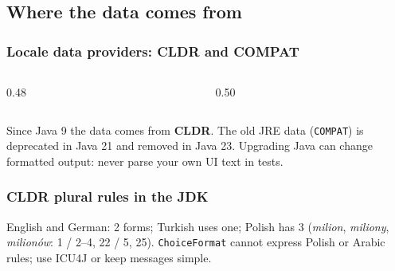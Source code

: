 \documentclass[aspectratio=169,10pt,compress]{beamer}
\begin{document}
\subsection[Providers]{Where the data comes from}




\begin{frame}[t,fragile] \frametitle{Locale data providers: CLDR and COMPAT}
  \begin{columns}[T]
    \begin{column}{0.48\textwidth}
    \end{column}
    \begin{column}{0.50\textwidth}
    \end{column}
  \end{columns}

  \vspace{0.1em}
  \small Since Java 9 the data comes from \textbf{CLDR}. The old JRE data (\texttt{COMPAT}) is deprecated
  in Java 21 and removed in Java 23. Upgrading Java can change formatted output: never parse your own UI text in tests.
\end{frame}





\begin{frame}[t,fragile] \frametitle{CLDR plural rules in the JDK}

  \vspace{0.1em}
  \small
  English and German: 2 forms; Turkish uses one; Polish has 3 (\emph{milion}, \emph{miliony}, \emph{milionów}:
  1 / 2--4, 22 / 5, 25). \texttt{ChoiceFormat} cannot express Polish or Arabic rules; use ICU4J or keep messages simple.
\end{frame}
\end{document}
